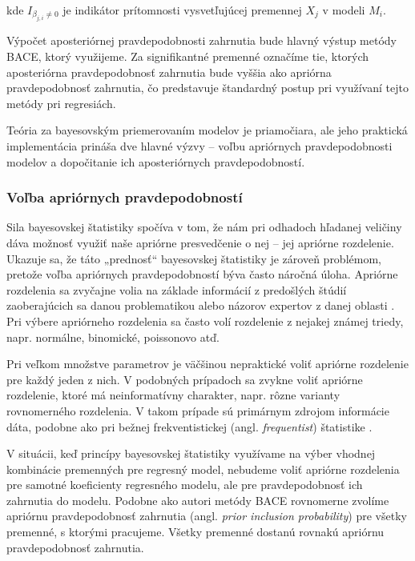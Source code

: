 kde \( I_{\beta_{j, i} \neq 0} \) je indikátor prítomnosti vysvetľujúcej premennej \( X_j \) v modeli \( M_i \).

Výpočet aposteriórnej pravdepodobnosti zahrnutia bude hlavný výstup metódy BACE, ktorý využijeme.
Za signifikantné premenné označíme tie, ktorých aposteriórna pravdepodobnosť zahrnutia bude vyššia ako apriórna pravdepodobnosť zahrnutia, čo predstavuje štandardný postup pri využívaní tejto metódy pri regresiách.

Teória za bayesovským priemerovaním modelov je priamočiara,
ale jeho praktická implementácia prináša dve hlavné výzvy – voľbu apriórnych pravdepodobnosti modelov a dopočitanie ich aposteriórnych pravdepodobností.

\subsubsection{Voľba apriórnych pravdepodobností}

Sila bayesovskej štatistiky spočíva v tom, že nám pri odhadoch hľadanej veličiny dáva možnosť využiť naše apriórne presvedčenie o nej – jej apriórne rozdelenie.
Ukazuje sa, že táto „prednosť“ bayesovskej štatistiky je zároveň problémom, pretože voľba apriórnych pravdepodobností býva často náročná úloha.
Apriórne rozdelenia sa zvyčajne volia na základe informácií z predošlých štúdií zaoberajúcich sa danou problematikou alebo názorov expertov z danej oblasti \cite{carlin}.
Pri výbere apriórneho rozdelenia sa často volí rozdelenie z nejakej známej triedy, napr. normálne, binomické, poissonovo atď.

Pri veľkom množstve parametrov je väčšinou nepraktické voliť apriórne rozdelenie pre každý jeden z nich.
V podobných prípadoch sa zvykne voliť apriórne rozdelenie, ktoré má neinformatívny charakter, napr. rôzne varianty rovnomerného rozdelenia.
V takom prípade sú primárnym zdrojom informácie dáta, podobne ako pri bežnej frekventistickej (angl. \emph{frequentist}) štatistike \cite{tiao}.

V situácii, keď princípy bayesovskej štatistiky využívame na výber vhodnej kombinácie premenných pre regresný model,
nebudeme voliť apriórne rozdelenia pre samotné koeficienty regresného modelu, ale pre pravdepodobnosť ich zahrnutia do modelu.
Podobne ako autori metódy BACE rovnomerne zvolíme apriórnu pravdepodobnosť zahrnutia (angl. \emph{prior inclusion probability}) pre všetky premenné,
s ktorými pracujeme. Všetky premenné dostanú rovnakú apriórnu pravdepodobnosť zahrnutia.

